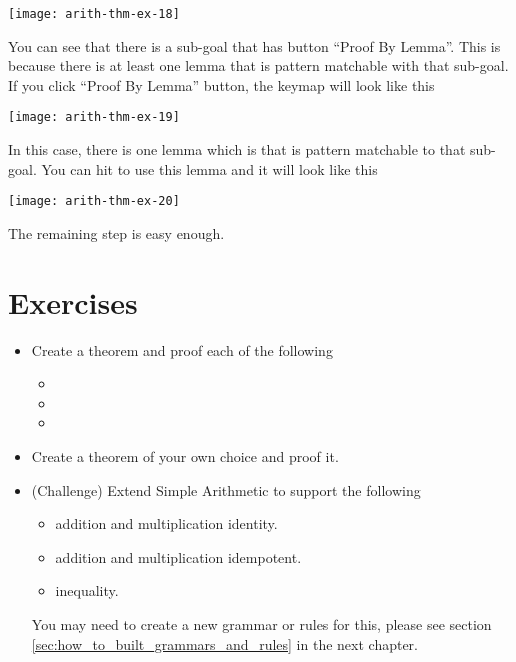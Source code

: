 \documentclass[master.tex]{subfiles}
\begin{document}
\texttt{[image: arith-thm-ex-18]}

\hspace{1ex}

You can see that there is a sub-goal that has button ``Proof By Lemma''. This is
because there is at least one lemma that is pattern matchable with that
sub-goal. If you click ``Proof By Lemma'' button, the keymap will look like this

\begin{center}
\texttt{[image: arith-thm-ex-19]}
\end{center}

In this case, there is one lemma which is  that is pattern
matchable to that sub-goal. You can hit  to use this lemma and it
will look like this

\texttt{[image: arith-thm-ex-20]}

The remaining step is easy enough.

\newpage
\section{Exercises}

\begin{itemize}
\item Create a theorem and proof each of the following
  \begin{itemize}
  \item {}
  \item {}
  \item {}
  \end{itemize}
\item Create a theorem of your own choice and proof it.
\item (Challenge) Extend Simple Arithmetic to support the following
  \begin{itemize}
  \item addition and multiplication identity.
  \item addition and multiplication idempotent.
  \item inequality.
  \end{itemize}
  You may need to create a new grammar or rules for this, please see section
  \ref{sec:how_to_built_grammars_and_rules} in the next chapter.
\end{itemize}
\end{document}

